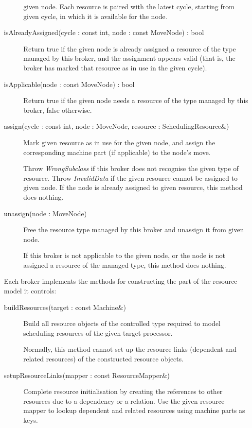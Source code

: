 \documentclass[a4paper,twoside]{tce}
\begin{document}
\begin{description}
  given node. Each resource is paired with the latest cycle, starting from
  given cycle, in which it is available for the node.
\item[isAlreadyAssigned(cycle : const int, node : const MoveNode) : bool]%
  Return true if the given node is already assigned a resource of the type
  managed by this broker, and the assignment appears valid (that is, the
  broker has marked that resource as in use in the given cycle).
\item[isApplicable(node : const MoveNode) : bool]%
  Return true if the given node needs a resource of the type managed by this
  broker, false otherwise.
\item[assign(cycle : const int, node : MoveNode, resource :
  SchedulingResource\&)]%
  Mark given resource as in use for the given node, and assign the
  corresponding machine part (if applicable) to the node's move.

  Throw \emph{WrongSubclass} if this broker does not recognise the given
  type of resource.
%
  Throw \emph{InvalidData} if the given resource cannot be assigned to given
  node.
%
  If the node is already assigned to given resource, this method does
  nothing.
\item[unassign(node : MoveNode)]%
  Free the resource type managed by this broker and unassign it from given
  node.

  If this broker is not applicable to the given node, or the node is not
  assigned a resource of the managed type, this method does nothing.
\end{description}

Each broker implements the methods for constructing the part of the resource
model it controls:
\begin{description}
\item[buildResources(target : const Machine\&)]%
  Build all resource objects of the controlled type required to model
  scheduling resources of the given target processor.

  Normally, this method cannot set up the resource links (dependent and
  related resources) of the constructed resource objects.
\item[setupResourceLinks(mapper : const ResourceMapper\&)]%
  Complete resource initialisation by creating the references to other
  resources due to a dependency or a relation. Use the given resource mapper
  to lookup dependent and related resources using machine parts as keys.
\end{description}
\end{document}
